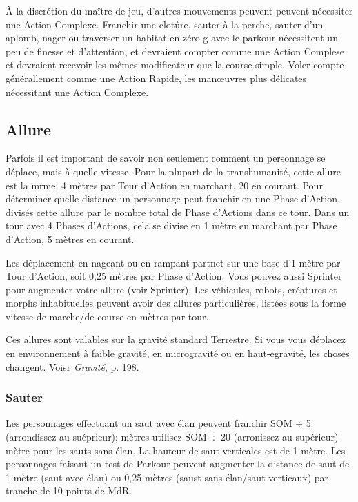 À la discrétion du maître de jeu, d'autres mouvements peuvent peuvent nécessiter une Action Complexe. Franchir une clotûre, sauter à la perche, sauter d'un aplomb, nager ou traverser un habitat en zéro-g avec le parkour nécessitent un peu de finesse et d'attention, et devraient compter comme une Action Complese et devraient recevoir les mêmes modificateur que la course simple. Voler compte générallement comme une Action Rapide, les manœuvres plus délicates nécessitant une Action Complexe. 



\subsection{Allure} \label{sec:movement-rates} 

Parfois il est important de savoir non seulement comment un personnage se déplace, mais à quelle vitesse. Pour la plupart de la transhumanité, cette allure est la mrme: 4 mètres par Tour d'Action en marchant, 20 en courant. Pour déterminer quelle distance un personnage peut franchir en une Phase d'Action, divisés cette allure par le nombre total de Phase d'Actions dans ce tour. Dans un tour avec 4 Phases d'Actions, cela se divise en 1 mètre en marchant par Phase d'Action, 5 mètres en courant. 

Les déplacement en nageant ou en rampant partnet sur une base d'1 mètre par Tour d'Action, soit 0,25 mètres par Phase d'Action. Vous pouvez aussi Sprinter pour augmenter votre allure (voir Sprinter). Les véhicules, robots, créatures et morphs inhabituelles peuvent avoir des allures particulières, listées sous la forme vitesse de marche/de course en mètres par tour. 

Ces allures sont valables sur la gravité standard Terrestre. Si vous vous déplacez en environnement à faible gravité, en microgravité ou en haut-egravité, les choses changent. Voisr \emph{ Gravité}, p. 198. 



\subsubsection{Sauter} 

Les personnages effectuant un saut avec élan peuvent franchir SOM $\div$ 5 (arrondissez au suéprieur); mètres utilisez SOM $\div$ 20 (arronissez au supérieur) mètre pour les sauts sans élan. La hauteur de saut verticales est de 1 mètre. Les personnages faisant un test de Parkour peuvent augmenter la distance de saut de 1 mètre (saut avec élan) ou 0,25 mètres (saust sans élan/saut verticaux) par tranche de 10 points de MdR. 

